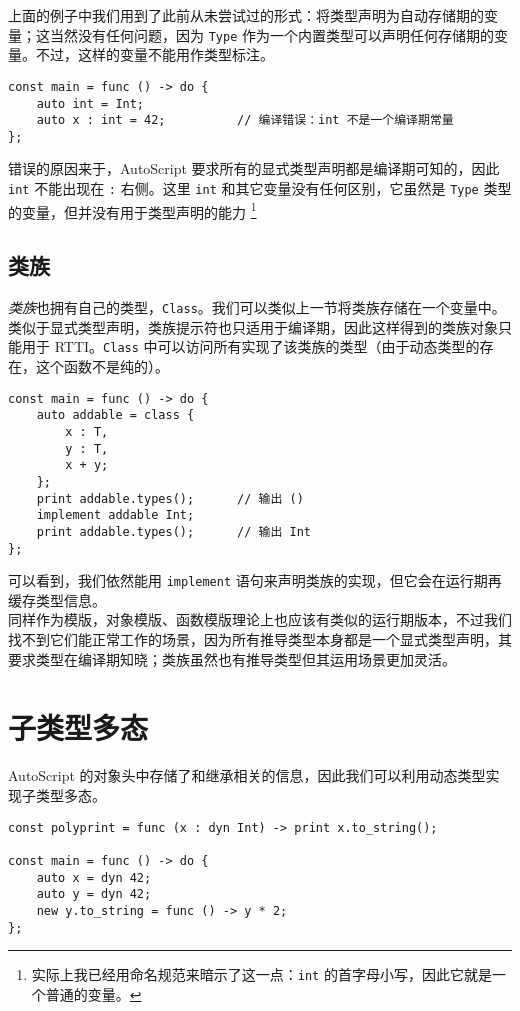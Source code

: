 上面的例子中我们用到了此前从未尝试过的形式：将类型声明为自动存储期的变量；这当然没有任何问题，因为 \lstinline!Type! 作为一个内置类型可以声明任何存储期的变量。不过，这样的变量不能用作类型标注。

\begin{lstlisting}
const main = func () -> do {
	auto int = Int;
	auto x : int = 42;			// 编译错误：int 不是一个编译期常量
};
\end{lstlisting}

错误的原因来于，AutoScript 要求所有的显式类型声明都是编译期可知的，因此 \lstinline!int! 不能出现在 \lstinline!:! 右侧。这里 \lstinline!int! 和其它变量没有任何区别，它虽然是 \lstinline!Type! 类型的变量，但并没有用于类型声明的能力 \footnote{实际上我已经用命名规范来暗示了这一点：\lstinline!int! 的首字母小写，因此它就是一个普通的变量。}

\subsection{类族}

\emph{类族}也拥有自己的类型，\lstinline!Class!。我们可以类似上一节将类族存储在一个变量中。类似于显式类型声明，类族提示符也只适用于编译期，因此这样得到的类族对象只能用于 RTTI。\lstinline!Class! 中可以访问所有实现了该类族的类型（由于动态类型的存在，这个函数不是纯的）。

\begin{lstlisting}
const main = func () -> do {
	auto addable = class {
		x : T,
		y : T,
		x + y;
	};
	print addable.types();		// 输出 ()
	implement addable Int;
	print addable.types();		// 输出 Int
};
\end{lstlisting}

可以看到，我们依然能用 \lstinline!implement! 语句来声明类族的实现，但它会在运行期再缓存类型信息。 \\

同样作为模版，对象模版、函数模版理论上也应该有类似的运行期版本，不过我们找不到它们能正常工作的场景，因为所有推导类型本身都是一个显式类型声明，其要求类型在编译期知晓；类族虽然也有推导类型但其运用场景更加灵活。


\section{子类型多态}

AutoScript 的对象头中存储了和继承相关的信息，因此我们可以利用动态类型实现子类型多态。

\begin{lstlisting}
const polyprint = func (x : dyn Int) -> print x.to_string();

const main = func () -> do {
	auto x = dyn 42;
	auto y = dyn 42;
	new y.to_string = func () -> y * 2;
};
\end{lstlisting}